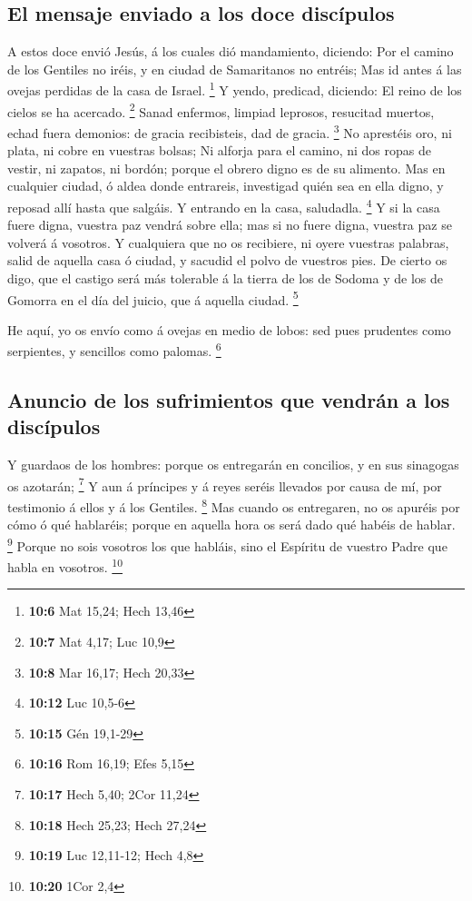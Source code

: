 \hypertarget{el-mensaje-enviado-a-los-doce-discuxedpulos}{%
\subsection{El mensaje enviado a los doce
discípulos}\label{el-mensaje-enviado-a-los-doce-discuxedpulos}}

 A estos doce envió Jesús, á los cuales dió mandamiento,
diciendo: Por el camino de los Gentiles no iréis, y en ciudad de
Samaritanos no entréis;  Mas id antes á las ovejas
perdidas de la casa de Israel. \footnote{\textbf{10:6} Mat 15,24; Hech
  13,46}  Y yendo, predicad, diciendo: El reino de los
cielos se ha acercado. \footnote{\textbf{10:7} Mat 4,17; Luc 10,9}
 Sanad enfermos, limpiad leprosos, resucitad muertos,
echad fuera demonios: de gracia recibisteis, dad de gracia. \footnote{\textbf{10:8}
  Mar 16,17; Hech 20,33}  No aprestéis oro, ni plata, ni
cobre en vuestras bolsas;  Ni alforja para el camino, ni
dos ropas de vestir, ni zapatos, ni bordón; porque el obrero digno es de
su alimento.  Mas en cualquier ciudad, ó aldea donde
entrareis, investigad quién sea en ella digno, y reposad allí hasta que
salgáis.  Y entrando en la casa, saludadla. \footnote{\textbf{10:12}
  Luc 10,5-6}  Y si la casa fuere digna, vuestra paz
vendrá sobre ella; mas si no fuere digna, vuestra paz se volverá á
vosotros.  Y cualquiera que no os recibiere, ni oyere
vuestras palabras, salid de aquella casa ó ciudad, y sacudid el polvo de
vuestros pies.  De cierto os digo, que el castigo será
más tolerable á la tierra de los de Sodoma y de los de Gomorra en el día
del juicio, que á aquella ciudad. \footnote{\textbf{10:15} Gén 19,1-29}

 He aquí, yo os envío como á ovejas en medio de lobos:
sed pues prudentes como serpientes, y sencillos como palomas.
\footnote{\textbf{10:16} Rom 16,19; Efes 5,15}

\hypertarget{anuncio-de-los-sufrimientos-que-vendruxe1n-a-los-discuxedpulos}{%
\subsection{Anuncio de los sufrimientos que vendrán a los
discípulos}\label{anuncio-de-los-sufrimientos-que-vendruxe1n-a-los-discuxedpulos}}

 Y guardaos de los hombres: porque os entregarán en
concilios, y en sus sinagogas os azotarán; \footnote{\textbf{10:17} Hech
  5,40; 2Cor 11,24}  Y aun á príncipes y á reyes seréis
llevados por causa de mí, por testimonio á ellos y á los Gentiles.
\footnote{\textbf{10:18} Hech 25,23; Hech 27,24}  Mas
cuando os entregaren, no os apuréis por cómo ó qué hablaréis; porque en
aquella hora os será dado qué habéis de hablar. \footnote{\textbf{10:19}
  Luc 12,11-12; Hech 4,8}  Porque no sois vosotros los
que habláis, sino el Espíritu de vuestro Padre que habla en vosotros.
\footnote{\textbf{10:20} 1Cor 2,4}

